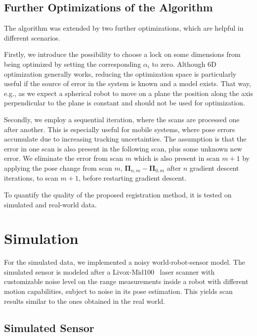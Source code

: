 \documentclass[5p]{elsarticle}
\renewcommand{\vec}[1]{\mathbf{#1}}
\begin{document}
\subsection{Further Optimizations of the Algorithm}
\label{ssec:furtheropts}

The algorithm was extended by two further optimizations, which are helpful in different scenarios.

Firstly, we introduce the possibility to choose a lock on some dimensions from being optimized by setting the corresponding $\alpha_i$ to zero.
Although 6D optimization generally works, reducing the optimization space is particularly useful if the source of error in the system is known and a model exists.
That way, e.g., as we expect a spherical robot to move on a plane the position along the axis perpendicular to the plane is constant and should not be used for optimization.

Secondly, we employ a sequential iteration, where the scans are processed one after another. 
This is especially useful for mobile systems, where pose errors accumulate due to increasing tracking uncertainties.
The assumption is that the error in one scan is also present in the following scan, plus some unknown new error.
We eliminate the error from scan $m$ which is also present in scan $m+1$ by applying the pose change from scan $m$, $\vec{\Pi}_{n,m} - \vec{\Pi}_{0,m}$ after $n$ gradient descent iterations, to scan $m+1$, before restarting gradient descent.

To quantify the quality of the proposed registration method, it is tested on simulated and real-world data. 

\section{Simulation}

For the simulated data, we implemented a noisy world-robot-sensor model.  
The simulated sensor is modeled after a Livox-Mid100~\cite{LivoxMid40-100} laser scanner with customizable noise level on the range measurements inside a robot with different motion capabilities, subject to noise in its pose estimation. 
This yields scan results similar to the ones obtained in the real world.

\subsection{Simulated Sensor}
\end{document}
